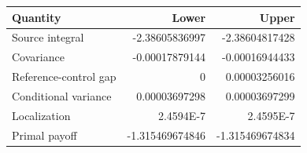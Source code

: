 \begin{tabular}{lrr}
\toprule
Quantity & Lower & Upper \\
\midrule
Source integral & -2.38605836997 & -2.38604817428 \\
Covariance & -0.00017879144 & -0.00016944433 \\
Reference-control gap & 0 & 0.00003256016 \\
Conditional variance & 0.00003697298 & 0.00003697299 \\
Localization & 2.4594E-7 & 2.4595E-7 \\
Primal payoff & -1.315469674846 & -1.315469674834 \\
\bottomrule
\end{tabular}
